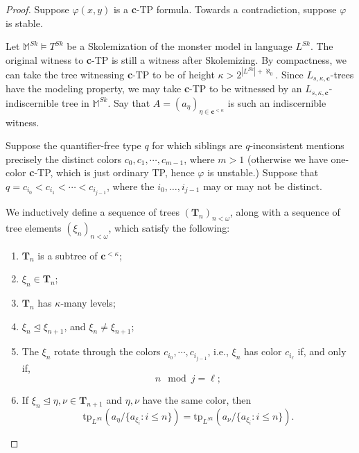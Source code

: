 \documentclass{article}
\newcommand{\bbM}{\mathbb{M}}
\newcommand{\tp}{\text{tp}}
\newcommand{\vphi}{\varphi}
\theoremstyle{definition}
\theoremstyle{definition}
\theoremstyle{definition}
\theoremstyle{definition}
\begin{document}
\begin{proof}
    Suppose $\vphi(x,y)$ is a \textbf{c}-TP formula. Towards a contradiction, suppose $\vphi$ is stable. 
    
    Let $\bbM^{Sk}\models T^{Sk}$ be a Skolemization of the monster model in language $L^{Sk}$. The original witness to \textbf{c}-TP is still a witness after Skolemizing. By compactness, we can take the tree witnessing \textbf{c}-TP to be of height $\kappa>2^{|L^{Sk}|+\aleph_0}$. Since $L_{s,\kappa, \textbf{c}}$-trees have the modeling property, we may take \textbf{c}-TP to be witnessed by an $L_{s,\kappa, \textbf{c}}$-indiscernible tree in $\bbM^{Sk}$.  Say that $A=(a_{\eta})_{\eta\in \textbf{c}^{<\kappa}}$ is such an indiscernible witness.

    Suppose the quantifier-free type $q$ for which siblings are $q$-inconsistent mentions precisely the distinct colors $c_0, c_1,\dotsm, c_{m-1}$, where $m> 1$ (otherwise we have one-color \textbf{c}-TP, which is just ordinary TP, hence $\vphi$ is unstable.) Suppose that $q=c_{i_0}<c_{i_1}<\dotsm <c_{{i_{j-1}}}$, where the $i_0,\dots, i_{j-1}$ may or may not be distinct.
    
    We inductively define a sequence of trees $(\textbf{T}_n)_{n<\omega}$, along with a  sequence of tree elements $(\xi_n)_{n<\omega}$, which satisfy the following:

    \begin{enumerate}[label=(\alph*)]
        \item $\textbf{T}_n$ is a subtree of $\textbf{c}^{<\kappa}$;

        \item $\xi_n\in \textbf{T}_n$;

        \item $\textbf{T}_n$ has $\kappa$-many levels;
        
        \item $\xi_n\trianglelefteq \xi_{n+1}$, and $\xi_n\neq \xi_{n+1}$;
    
        \item The $\xi_n$ rotate through the colors $c_{i_0},\dotsm, c_{i_{j-1}}$, i.e., $\xi_n$ has color $c_{i_\ell}$ if, and only if, $$n\mod j=\ell;$$

    
        \item If $\xi_{n}\trianglelefteq\eta,\nu\in\textbf{T}_{n+1}$  and $\eta,\nu$ have the same color, then  $$\tp_{L^{Sk}}(a_\eta/\{a_{\xi_i}\colon i\leq n\})=\tp_{L^{Sk}}(a_\nu/\{a_{\xi_i}\colon i\leq n\}).$$
    \end{enumerate}


\end{proof}
\end{document}

